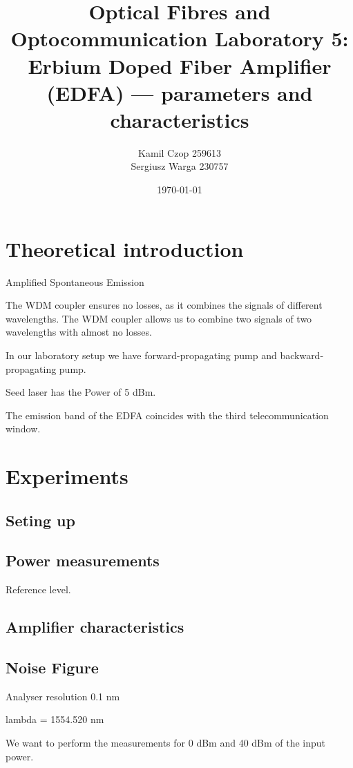 \documentclass[a4paper]{article}
\title{Optical Fibres and Optocommunication Laboratory 5:
Erbium Doped Fiber Amplifier (EDFA) --- parameters and characteristics
}
\author{Kamil Czop 259613\\Sergiusz Warga 230757}
\date{\today}
\begin{document}
\maketitle

\section{Theoretical introduction}

Amplified Spontaneous Emission


The WDM coupler ensures no losses, as it combines the signals of different wavelengths.
The WDM coupler allows us to combine two signals of two wavelengths with almost no losses.

In our laboratory setup we have forward-propagating pump and backward-propagating pump. 

Seed laser has the Power of 5 dBm.


The emission band of the EDFA coincides with the third telecommunication window.





\section{Experiments}

\subsection{Seting up}
\subsection{Power measurements}
Reference level.
\subsection{Amplifier characteristics}
\subsection{Noise Figure}
Analyser resolution 0.1 nm 

lambda = 1554.520 nm

We want to perform the measurements for 0 dBm and 40 dBm of the input power.
\end{document}
